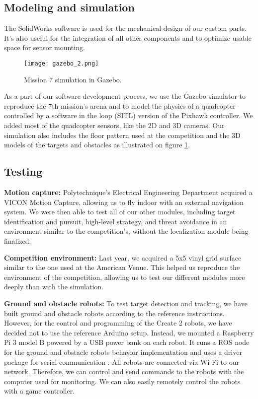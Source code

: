 \subsection*{Modeling and simulation} \label{subsec:risk-modelsim}

The SolidWorks software is used for the mechanical design of our custom parts. It’s also useful for the integration of all other components and to optimize usable space for sensor mounting.

\begin{figure}[h]
	\texttt{[image: gazebo\_2.png]}
	\vspace{-0.5cm}
	\caption{Mission 7 simulation in Gazebo.}
	\label{fig:model-gazebo}
\end{figure}

As a part of our software development process, we use the Gazebo simulator \cite{koenig2004design} to reproduce the 7th mission’s arena and to model the physics of a quadcopter controlled by a software in the loop (SITL) version of the Pixhawk controller. We added most of the quadcopter sensors, like the 2D and 3D cameras. Our simulation also includes the floor pattern used at the competition and the 3D models of the targets and obstacles as illustrated on figure \ref{fig:model-gazebo}.

\subsection*{Testing} \label{subsec:risk-test}

\textbf{Motion capture:} Polytechnique’s Electrical Engineering Department acquired a VICON Motion Capture, allowing us to fly indoor with an external navigation system. We were then able to test all of our other modules, including target identification and pursuit, high-level strategy, and threat avoidance in an environment similar to the competition’s, without the localization module being finalized.

\textbf{Competition environment:} Last year, we acquired a 5x5 vinyl grid surface similar to the one used at the American Venue. This helped us reproduce the environment of the competition, allowing us to test our different modules more deeply than with the simulation.

\textbf{Ground and obstacle robots:} To test target detection and tracking, we have built ground and obstacle robots according to the reference instructions. However, for the control and programming of the Create 2 robots, we have decided not to use the reference Arduino setup. Instead, we mounted a Raspberry Pi 3 model B powered by a USB power bank on each robot. It runs a ROS node for the ground and obstacle robots behavior implementation and uses a driver package for serial communication \cite{roscreateautonomy}. All robots are connected via Wi-Fi to our network. Therefore, we can control and send commands to the robots with the computer used for monitoring. We can also easily remotely control the robots with a game controller.
